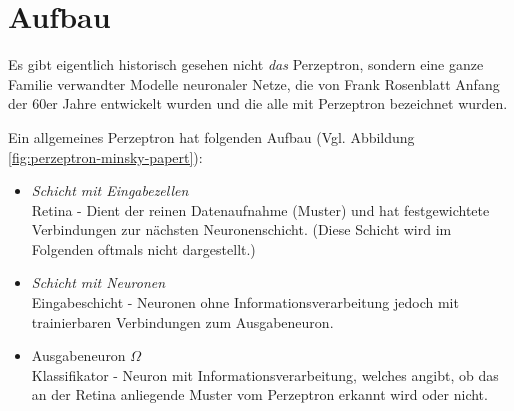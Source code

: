 \section*{Aufbau}
Es gibt eigentlich historisch gesehen nicht \textit{das} Perzeptron, sondern eine ganze Familie verwandter Modelle neuronaler Netze, die von Frank Rosenblatt Anfang der 60er Jahre entwickelt wurden und die alle mit Perzeptron bezeichnet wurden.

Ein allgemeines Perzeptron hat folgenden Aufbau (Vgl. Abbildung \ref{fig:perzeptron-minsky-papert}):
\begin{itemize}
	\item \emph{Schicht mit Eingabezellen} \\
	Retina - Dient der reinen Datenaufnahme (Muster) und hat festgewichtete Verbindungen zur nächsten Neuronenschicht. (Diese Schicht wird im Folgenden oftmals nicht dargestellt.)
	
	\item \emph{Schicht mit Neuronen} \\
	Eingabeschicht - Neuronen ohne Informationsverarbeitung jedoch mit trainierbaren Verbindungen zum Ausgabeneuron.

	\item Ausgabeneuron $\Omega$ \\
	Klassifikator - Neuron mit Informationsverarbeitung, welches angibt, ob das an der Retina anliegende Muster vom Perzeptron erkannt wird oder nicht.
\end{itemize}

